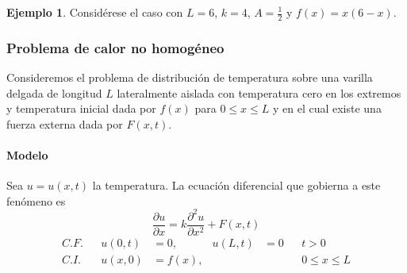 \documentclass[11pt,letterpaper,draft]{report}
\theoremstyle{plain}
\theoremstyle{definition}
\newtheorem{example}[theorem]{Ejemplo}
\theoremstyle{remark}
\newcommand\<{\langle}
\renewcommand\>{\rangle}
\begin{document}
\begin{example}
  Considérese el caso con $L=6$, $k=4$, $A=\frac{1}{2}$ y $f(x)=x(6-x)$.
\end{example}

\subsubsection{Problema de calor no homogéneo}

Consideremos el problema de distribución de temperatura sobre una varilla
delgada de longitud $L$ lateralmente aislada con temperatura cero en los
extremos y temperatura inicial dada por $f(x)$ para $0\leq x\leq L$ y en el cual
existe una fuerza externa dada por $F(x,t)$.

\paragraph{Modelo}

Sea $u=u(x,t)$ la temperatura. La ecuación diferencial que gobierna a este
fenómeno es
\begin{equation}\label{eqn:uno}
  \frac{\partial u}{\partial x}
  =k \frac{\partial^2 u}{\partial x^2} + F(x,t)
\end{equation}
\begin{align*}
  C.F. && u(0,t) &= 0, & u(L,t)&= 0 && t>0 \\
  C.I. && u(x,0) &= f(x), &&&& 0\leq x\leq L
\end{align*}
\end{document}

